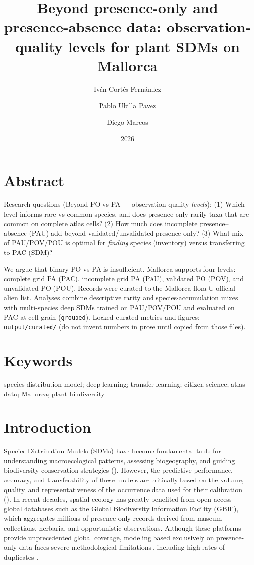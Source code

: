 \documentclass{article}
\title{Beyond presence-only and presence-absence data: observation-quality levels for plant SDMs on Mallorca}
\author{Iv\'an Cort\'es-Fern\'andez \and Pablo Ubilla Pavez \and Diego Marcos}
\date{2026}
\begin{document}
\maketitle

\section{Abstract}

Research questions (Beyond PO vs PA --- observation-quality \emph{levels}):
(1) Which level informs rare vs common species, and does presence-only rarify taxa that are common on complete atlas cells?
(2) How much does incomplete presence--absence (PAU) add beyond validated/unvalidated presence-only?
(3) What mix of PAU/POV/POU is optimal for \emph{finding} species (inventory) versus transferring to PAC (SDM)?

We argue that binary PO vs PA is insufficient. Mallorca supports four levels: complete grid PA (PAC), incomplete grid PA (PAU), validated PO (POV), and unvalidated PO (POU). Records were curated to the Mallorca flora $\cup$ official alien list. Analyses combine descriptive rarity and species-accumulation mixes with multi-species deep SDMs trained on PAU/POV/POU and evaluated on PAC at cell grain (\texttt{grouped}). Locked curated metrics and figures: \texttt{output/curated/} (do not invent numbers in prose until copied from those files).

\section{Keywords}

species distribution model; deep learning; transfer learning; citizen science; atlas data; Mallorca; plant biodiversity


\section{Introduction}

Species Distribution Models (SDMs) have become fundamental tools for understanding macroecological patterns, assessing biogeography, and guiding biodiversity conservation strategies (). However, the predictive performance, accuracy, and transferability of these models are critically based on the volume, quality, and representativeness of the occurrence data used for their calibration (). In recent decades, spatial ecology has greatly benefited from open-access global databases such as the Global Biodiversity Information Facility (GBIF), which aggregates millions of presence-only records derived from museum collections, herbaria, and opportunistic observations. Although these platforms provide unprecedented global coverage, modeling based exclusively on presence-only data faces severe methodological limitations,, including high rates of duplicates \cite{insects16080769}. 
\end{document}
